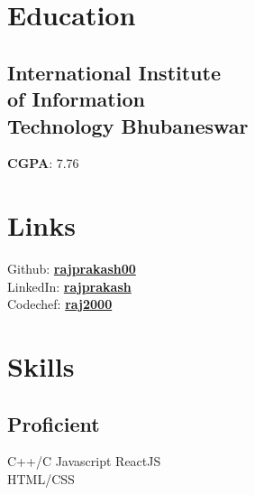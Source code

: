 \documentclass[]{deedy-resume-openfont}
\begin{document}
%
%

%
%

\begin{minipage}[t]{0.36\textwidth} 


\section{Education} 

\subsection{International Institute \\
of Information \\
Technology Bhubaneswar}
\item \textbf{CGPA}: 7.76
\sectionsep


\section{Links} 
Github: \href{https://github.com/rajprakash00}{\bf rajprakash00} \\
LinkedIn:  \href{https://www.linkedin.com/in/rajprakash-sahoo-7597a216a/}{\bf rajprakash} \\
Codechef: \href{https://codechef.com/users/raj2000}{\bf raj2000}



\section{Skills}
\subsection{Proficient}
C++/C \textbullet{}   Javascript \textbullet{} ReactJS \\
HTML/CSS
\sectionsep

\end{minipage}
\end{document}
